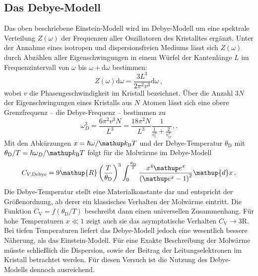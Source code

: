 \subsection{Das Debye-Modell}
\label{subsec:debye}
Das oben beschriebene Einstein-Modell wird im Debye-Modell um eine spektrale
Verteilung $Z(\omega)$ der Frequenzen aller Oszillatoren des Kristalltes
ergänzt.
Unter der Annahme eines isotropen und dispersionsfreien Mediums lässt sich
$Z(\omega)$ durch Abzählen aller Eigenschwingungen in einem Würfel
der Kantenlänge $L$ im Frequenzintervall von $\omega$ bis
$\omega+\mathup{d}\omega$ bestimmen:
\begin{equation}
    \label{eqn:z}
    Z(\omega)\mathup{d}\omega = \frac{3L^3}{2\pi^2 v^3} \mathup{d}\omega\,,
\end{equation}
wobei $v$ die Phasengeschwindigkeit im Kristall bezeichnet.
Über die Anzahl $3N$ der Eigenschwingungen eines Kristalls aus $N$ Atomen
lässt sich eine obere Grenzfrequenz -- die Debye-Frequenz -- bestimmen zu
\begin{equation}
    \label{eqn:omega_debye}
    \omega_D^3 = \frac{6\pi^2 v^3 N}{L^3} = \frac{18 \pi^2 N}{L^3} \frac{1}{\frac{1}{v_\text{l}^3}+\frac{2}{v_\text{tr}^3}},.
\end{equation}
Mit den Abkürzungen $x = \hbar\omega/\kb T$ und der Debye-Temperatur
$\theta_\text{D}$ mit $\theta_\text{D}/T = \hbar\omega_D/\kb T$ folgt
für die Molwärme im Debye-Modell
\begin{equation}
    \label{eqn:cv_debye}
    C_{V,\text{Debye}} =
    9\mathup{R}\left(\frac{T}{\theta_\text{D}}\right)^3
    \int_0^{\frac{\theta_\text{D}}{T}}
    \frac{x^4\e^x}{\left(\e^x-1\right)^2}\mathup{d}x\,.
\end{equation}
Die Debye-Temperatur stellt eine Materialkonstante dar und entspricht der
Größenordnung, ab derer ein klassisches Verhalten der Molwärme eintritt.
Die Funktion $C_\mathrm{V} = f(\theta_\text{D}/T)$ beschreibt dann einen universellen
Zusammenhang. Für hohe Temperaturen $x \ll \num{1}$ zeigt auch sie das
asymptotische Verhalten $C_\mathrm{V}\to 3\mathup{R}$.
Bei tiefen Temperaturen liefert das Debye-Modell jedoch eine wesentlich
bessere Näherung, als das Einstein-Modell.
Für eine Exakte Beschreibung der Molwärme müsste schließlich die Dispersion,
sowie der Beitrag der Leitungselektronen im Kristall betrachtet werden.
Für diesen Versuch ist die Nutzung des Debye-Modells dennoch ausreichend.


